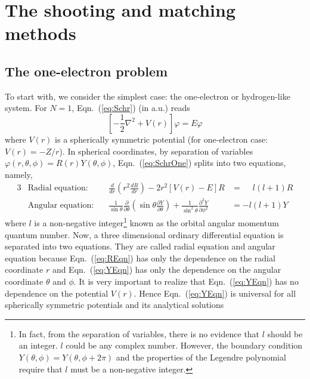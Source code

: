 \chapter{The shooting and matching methods}

\section{The one-electron problem}
To start with, we consider the simplest case: the one-electron or hydrogen-like
system. For $N=1$, Eqn.~(\ref{eq:Schr}) (in a.u.) reads
\begin{equation} \label{eq:SchrOne}
\left[ -\frac{1}{2} \nabla^2 + V(r) \right] \varphi = E \varphi
\end{equation}
where $V(r)$ is a spherically symmetric potential (for one-electron case: $V(r)=-Z/r$).
In spherical coordinates, by separation of variables
$\varphi(r,\theta,\phi) = R(r)Y(\theta,\phi)$, Eqn.~(\ref{eq:SchrOne}) splits
into two equations, namely,
\begin{alignat}{3}
& \text{Radial equation:} \quad & \frac{d}{d r} \left( r^2 \frac{d R}{d r} \right) - 2 r^2 \left[ V(r) - E \right] R                                                                                                     & = \phantom{-}l(l+1) R \label{eq:REqn} \\
& \text{Angular equation:}\quad & \frac{1}{\sin{\theta}} \frac{\partial}{\partial \theta} \left( \sin{\theta} \frac{\partial Y}{\partial \theta} \right) + \frac{1}{\sin^2{\theta}} \frac{\partial^2 Y}{\partial \phi^2} & = -l(l+1) Y \label{eq:YEqn}
\end{alignat}
where $l$ is a non-negative integer\footnote{In fact, from the separation of variables,
there is no evidence that $l$ should be an integer. $l$ could be
any complex number. However, the boundary condition $Y(\theta,\phi)=Y(\theta,\phi+2\pi)$
and the properties of the Legendre polynomial require that $l$ must be
a non-negative integer.} known as the orbital angular momentum quantum number.
Now, a three dimensional ordinary differential equation is separated into two
equations. They are called radial equation and angular equation because
Eqn.~(\ref{eq:REqn}) has only the dependence on the radial coordinate $r$ and
Eqn.~(\ref{eq:YEqn}) has only the dependence on the angular coordinate $\theta$
and $\phi$. It is very important to realize that Eqn.~(\ref{eq:YEqn}) has
no dependence on the potential $V(r)$. Hence Eqn.~(\ref{eq:YEqn}) is
universal for all spherically symmetric potentials and its analytical solutions
